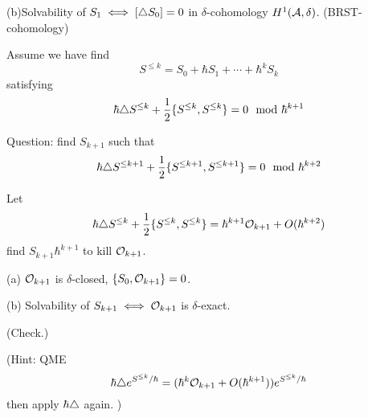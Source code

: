 (b)Solvability of $S_1\iff[\triangle S_0]=0$ in $\delta$-cohomology $H^1(\mathcal{A},\delta)$.
(BRST-cohomology)

Assume we have find 
$$S^{\leq k}=S_0+\hbar S_1+\cdots+\hbar^k S_k$$
satisfying 
$$\hbar\triangle S^{\leq k}+\frac{1}{2}\{S^{\leq k},S^{\leq k}\}=0\mod\hbar^{k+1}$$

Question: find $S_{k+1}$ such that 
$$\hbar\triangle S^{\leq k+1}+
\frac{1}{2}\{S^{\leq k+1},S^{\leq k+1}\}=0\mod\hbar^{k+2}$$

Let 
$$\hbar\triangle S^{\leq k}+\frac{1}{2}\{S^{\leq k},S^{\leq k}\}
=\hbar^{k+1}\mathcal{O}_{k+1}+O(\hbar^{k+2})$$
find $S_{k+1}\hbar^{k+1}$ to kill $\mathcal{O}_{k+1}$.

(a) $\mathcal{O}_{k+1}$ is $\delta$-closed, $\{S_0,\mathcal{O}_{k+1}\}=0$.

(b) Solvability of $S_{k+1}\iff \mathcal{O}_{k+1}$ is $\delta$-exact.

(Check.)

(Hint: QME
$$\hbar \triangle e^{S^{\leq k}/\hbar}
=(\hbar^k\mathcal{O}_{k+1}+O(\hbar^{k+1}))e^{S^{\leq k}/\hbar}$$
then apply $\hbar\triangle$ again.
)
